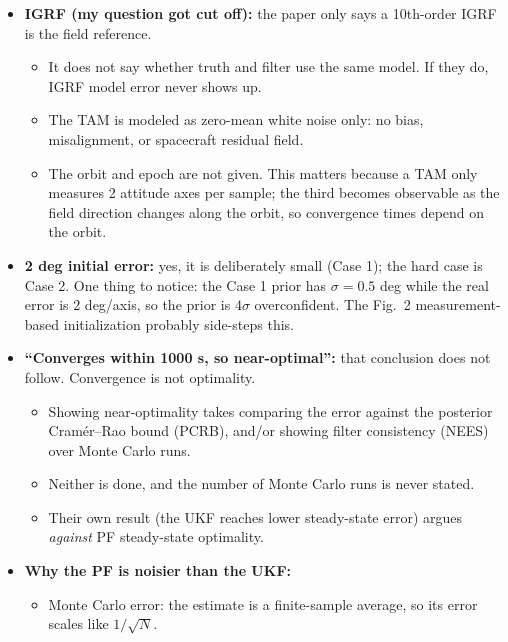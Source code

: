 \documentclass[11pt]{article}
\begin{document}
\begin{itemize}[noitemsep]
\begin{itemize}[noitemsep]
        \item Caveat: $q$ and $-q$ map to different $\rho$ (the ``shadow set''). Also, a weighted mean of GRPs (Eq.\ 20) is only a good attitude average when the particle cloud is tight. The paper discusses neither point.
    \end{itemize}
    \item \textbf{IGRF (my question got cut off):} the paper only says a 10th-order IGRF is the field reference.
    \begin{itemize}[noitemsep]
        \item It does not say whether truth and filter use the same model. If they do, IGRF model error never shows up.
        \item The TAM is modeled as zero-mean white noise only: no bias, misalignment, or spacecraft residual field.
        \item The orbit and epoch are not given. This matters because a TAM only measures 2 attitude axes per sample; the third becomes observable as the field direction changes along the orbit, so convergence times depend on the orbit.
    \end{itemize}
    \item \textbf{2 deg initial error:} yes, it is deliberately small (Case 1); the hard case is Case 2. One thing to notice: the Case 1 prior has $\sigma = 0.5$ deg while the real error is 2 deg/axis, so the prior is $4\sigma$ overconfident. The Fig.\ 2 measurement-based initialization probably side-steps this.
    \item \textbf{``Converges within 1000 s, so near-optimal'':} that conclusion does not follow. Convergence is not optimality.
    \begin{itemize}[noitemsep]
        \item Showing near-optimality takes comparing the error against the posterior Cram\'er--Rao bound (PCRB), and/or showing filter consistency (NEES) over Monte Carlo runs.
        \item Neither is done, and the number of Monte Carlo runs is never stated.
        \item Their own result (the UKF reaches lower steady-state error) argues \textit{against} PF steady-state optimality.
    \end{itemize}
    \item \textbf{Why the PF is noisier than the UKF:}
    \begin{itemize}[noitemsep]
        \item Monte Carlo error: the estimate is a finite-sample average, so its error scales like $1/\sqrt{N}$.

\end{itemize}
\end{itemize}
\end{document}
